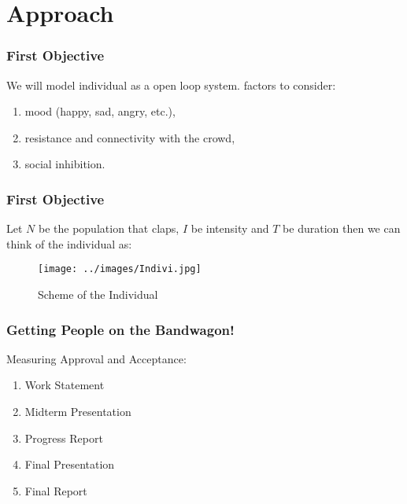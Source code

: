 \documentclass[compress,handout,10pt]{beamer}
\let\olditem\item
\renewcommand{\item}{\setlength{\itemsep}{0.5\baselineskip}\olditem}
\begin{document}
\section{Approach}
\begin{frame}
\frametitle{First Objective}
We will model individual as a open loop system.\newline{} factors to consider: \newline
	\begin{enumerate}
		\item mood (happy, sad, angry, etc.),\newline \newline
		\item resistance and connectivity with the crowd,\newline\newline
		\item social inhibition.		
	\end{enumerate}
\end{frame}

\begin{frame}
\frametitle{First Objective}
Let $N$ be the population that claps, $I$ be intensity and $T$ be duration then we can think of the individual as:\newline\newline\newline

\begin{figure}[h]
    \begin{center}
        \texttt{[image: ../images/Indivi.jpg]}
    \end{center}
    \caption{Scheme of the Individual}
    \label{fig:individual}
\end{figure}


\end{frame}
\begin{frame}
    \frametitle{Getting People on the Bandwagon!}
    Measuring Approval and Acceptance:
    \vspace{7pt}
             \begin{enumerate}
                 \item Work Statement
                 \item Midterm Presentation
                 \item Progress Report
                 \item Final Presentation
                 \item Final Report
             \end{enumerate}
\end{frame}
\end{document}
